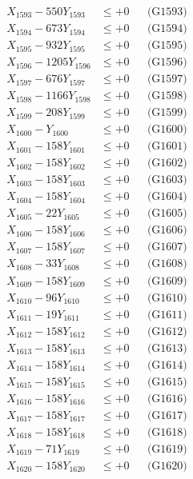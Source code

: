 \documentclass[a4paper,10pt]{article}
\begin{document}
{\begin{align}
X_{1593} - 550Y_{1593} &\leq +0 && \text{(G1593)} \\
X_{1594} - 673Y_{1594} &\leq +0 && \text{(G1594)} \\
X_{1595} - 932Y_{1595} &\leq +0 && \text{(G1595)} \\
X_{1596} - 1205Y_{1596} &\leq +0 && \text{(G1596)} \\
X_{1597} - 676Y_{1597} &\leq +0 && \text{(G1597)} \\
X_{1598} - 1166Y_{1598} &\leq +0 && \text{(G1598)} \\
X_{1599} - 208Y_{1599} &\leq +0 && \text{(G1599)} \\
X_{1600} - Y_{1600} &\leq +0 && \text{(G1600)} \\
\allowbreak
X_{1601} - 158Y_{1601} &\leq +0 && \text{(G1601)} \\
X_{1602} - 158Y_{1602} &\leq +0 && \text{(G1602)} \\
X_{1603} - 158Y_{1603} &\leq +0 && \text{(G1603)} \\
X_{1604} - 158Y_{1604} &\leq +0 && \text{(G1604)} \\
X_{1605} - 22Y_{1605} &\leq +0 && \text{(G1605)} \\
X_{1606} - 158Y_{1606} &\leq +0 && \text{(G1606)} \\
X_{1607} - 158Y_{1607} &\leq +0 && \text{(G1607)} \\
X_{1608} - 33Y_{1608} &\leq +0 && \text{(G1608)} \\
X_{1609} - 158Y_{1609} &\leq +0 && \text{(G1609)} \\
X_{1610} - 96Y_{1610} &\leq +0 && \text{(G1610)} \\
\allowbreak
X_{1611} - 19Y_{1611} &\leq +0 && \text{(G1611)} \\
X_{1612} - 158Y_{1612} &\leq +0 && \text{(G1612)} \\
X_{1613} - 158Y_{1613} &\leq +0 && \text{(G1613)} \\
X_{1614} - 158Y_{1614} &\leq +0 && \text{(G1614)} \\
X_{1615} - 158Y_{1615} &\leq +0 && \text{(G1615)} \\
X_{1616} - 158Y_{1616} &\leq +0 && \text{(G1616)} \\
X_{1617} - 158Y_{1617} &\leq +0 && \text{(G1617)} \\
X_{1618} - 158Y_{1618} &\leq +0 && \text{(G1618)} \\
X_{1619} - 71Y_{1619} &\leq +0 && \text{(G1619)} \\
X_{1620} - 158Y_{1620} &\leq +0 && \text{(G1620)} \\

\end{align}}
\end{document}
